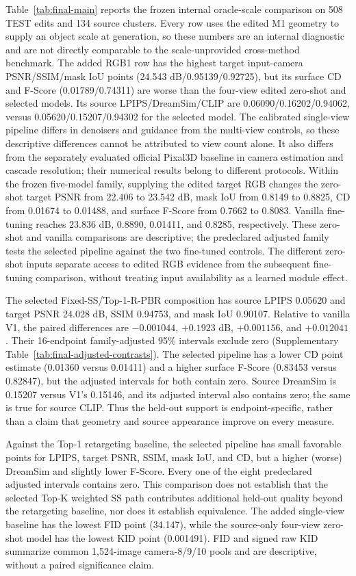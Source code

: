 Table~\ref{tab:final-main} reports the frozen internal oracle-scale comparison
on 508 TEST edits and 134 source clusters. Every row uses the edited M1
geometry to supply an object scale at generation, so these numbers are an
internal diagnostic and are not directly comparable to the scale-unprovided
cross-method benchmark. The added RGB1 row has the highest target input-camera
PSNR/SSIM/mask IoU points (24.543 dB/0.95139/0.92725), but its surface CD
and F-Score (0.01789/0.74311) are worse than the four-view edited zero-shot
and selected models. Its source LPIPS/DreamSim/CLIP are
0.06090/0.16202/0.94062, versus 0.05620/0.15207/0.94302 for the selected
model. The calibrated single-view pipeline differs in denoisers and guidance
from the multi-view controls, so these descriptive differences cannot be
attributed to view count alone. It also differs from the separately evaluated
official Pixal3D baseline in camera estimation and cascade resolution; their
numerical results belong to different protocols. Within the frozen five-model
family, supplying the edited
target RGB changes the zero-shot target PSNR from 22.406 to 23.542 dB,
mask IoU from 0.8149 to 0.8825, CD from 0.01674 to 0.01488, and surface
F-Score from 0.7662 to 0.8083. Vanilla fine-tuning reaches 23.836 dB,
0.8890, 0.01411, and 0.8285, respectively. These zero-shot and vanilla
comparisons are descriptive; the predeclared adjusted family tests the
selected pipeline against the two fine-tuned controls. The different
zero-shot inputs separate access to edited RGB evidence from the subsequent
fine-tuning comparison, without treating input availability as a learned
module effect.

The selected Fixed-SS/Top-1-R-PBR composition has source LPIPS 0.05620 and
target PSNR 24.028 dB, SSIM 0.94753, and mask IoU 0.90107. Relative to
vanilla V1, the paired differences are $-0.001044$, $+0.1923$ dB,
$+0.001156$, and $+0.012041$. Their 16-endpoint family-adjusted 95\%
intervals exclude zero (Supplementary
Table~\ref{tab:final-adjusted-contrasts}). The selected pipeline has a
lower CD point estimate (0.01360 versus 0.01411) and a higher surface
F-Score (0.83453 versus 0.82847), but the adjusted intervals for both
contain zero. Source DreamSim is 0.15207 versus V1's 0.15146, and its
adjusted interval also contains zero; the same is true for source CLIP.
Thus the held-out support is endpoint-specific, rather than a claim that
geometry and source appearance improve on every measure.

Against the Top-1 retargeting baseline, the selected pipeline has small
favorable points for LPIPS, target PSNR, SSIM, mask IoU, and CD, but a
higher (worse) DreamSim and slightly lower F-Score. Every one of the eight
predeclared adjusted intervals contains zero. This comparison does not
establish that the selected Top-K weighted SS path contributes additional
held-out quality beyond the retargeting baseline, nor does it establish
equivalence. The added single-view baseline has the lowest FID point (34.147),
while the source-only four-view zero-shot model has the lowest KID point
(0.001491). FID
and signed raw KID summarize common 1,524-image camera-8/9/10 pools and are
descriptive, without a paired significance claim.

